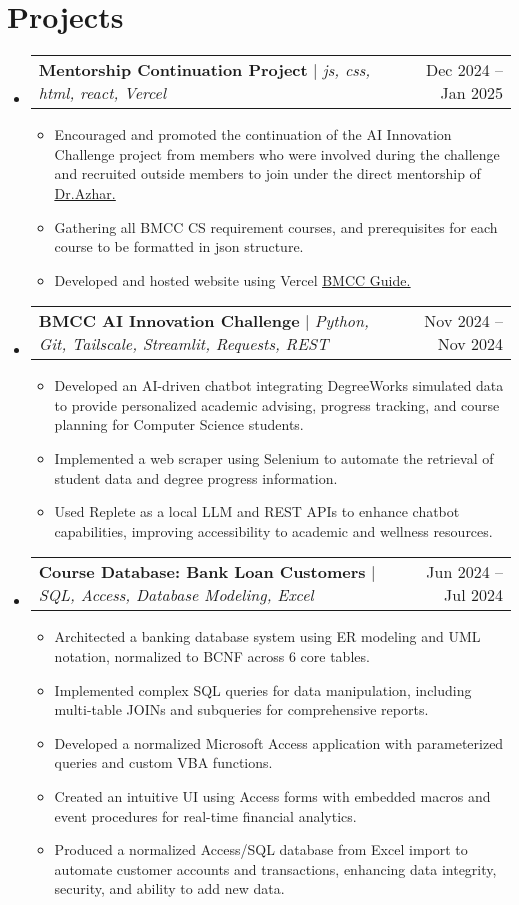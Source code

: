 \documentclass[letterpaper,10pt]{article}
\makeatletter
\newcommand{\resumeItem}[1]{
  \item\small{
    {#1 \vspace{-2pt}}
  }
}
\newcommand{\resumeProjectHeading}[2]{
    \item
    \begin{tabular*}{0.97\textwidth}{l@{\extracolsep{\fill}}r}
      \small#1 & #2 \\
    \end{tabular*}\vspace{-6pt}
}
\newcommand{\resumeSubHeadingListStart}{\begin{itemize}[leftmargin=0.15in, label={}]}
\newcommand{\resumeSubHeadingListEnd}{\end{itemize}}
\newcommand{\resumeItemListStart}{\begin{itemize}[itemsep=0pt]}
\newcommand{\resumeItemListEnd}{\end{itemize}\vspace{-4pt}}
\makeatother
\begin{document}
\section{Projects}
  \resumeSubHeadingListStart
      \resumeProjectHeading
          {\textbf{Mentorship Continuation Project} $|$ \emph{js, css, html, react, Vercel}}{Dec 2024 -- Jan 2025}
          \resumeItemListStart
        \resumeItem{Encouraged and promoted the continuation of the AI Innovation Challenge project from members who were involved during the challenge and recruited outside members to join under the direct mentorship of {\underline{\href{https://www.bmcc.cuny.edu/faculty/mohammad-azhar/}{Dr.Azhar.}}}}
        \resumeItem{Gathering all BMCC CS requirement courses, and prerequisites for each course to be formatted in json structure.}
        \resumeItem{Developed and hosted website using Vercel {\underline{\href{https://bmcc-guide.vercel.app/}{BMCC Guide.}}}}
          \resumeItemListEnd
      \resumeProjectHeading
          {\textbf{BMCC AI Innovation Challenge} $|$ \emph{Python, Git, Tailscale, Streamlit, Requests, REST}}{Nov 2024 -- Nov 2024}
          \resumeItemListStart
            \resumeItem{Developed an AI-driven chatbot integrating DegreeWorks simulated data to provide personalized academic advising, progress tracking, and course planning for Computer Science students.}
            \resumeItem{Implemented a web scraper using Selenium to automate the retrieval of student data and degree progress information.}
           \resumeItem{Used Replete as a local LLM and REST APIs to enhance chatbot capabilities, improving accessibility to academic and wellness resources.}
          \resumeItemListEnd
      \resumeProjectHeading
          {\textbf{Course Database: Bank Loan Customers} $|$ \emph{SQL, Access, Database Modeling, Excel}}{Jun 2024 -- Jul 2024}
          \resumeItemListStart
            \resumeItem{Architected a banking database system using ER modeling and UML notation, normalized to BCNF across 6 core tables.}
            \resumeItem{Implemented complex SQL queries for data manipulation, including multi-table JOINs and subqueries for comprehensive reports.}
            \resumeItem{Developed a normalized Microsoft Access application with parameterized queries and custom VBA functions.}
            \resumeItem{Created an intuitive UI using Access forms with embedded macros and event procedures for real-time financial analytics.}
             \resumeItem{Produced a normalized Access/SQL database from Excel import to automate customer accounts and transactions, enhancing data integrity, security, and ability to add new data. }
          \resumeItemListEnd
  \resumeSubHeadingListEnd
 
\end{document}

